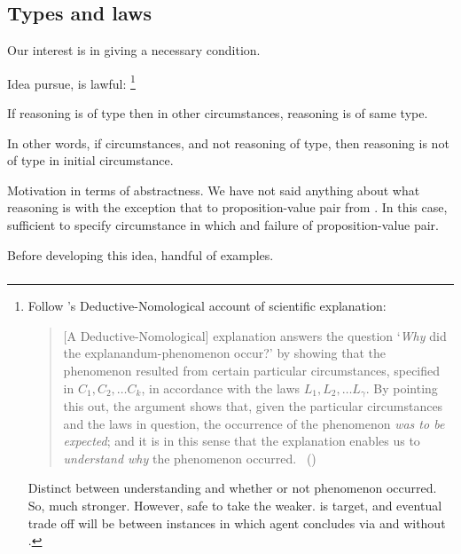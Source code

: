 \subsection{Types and laws}

\begin{note}
  Our interest is in giving a necessary condition.

  Idea pursue, \tRN{} is lawful:%
  \footnote{
    Follow \citeauthor{Hempel:1965aa}'s Deductive-Nomological account of scientific explanation:

    \begin{quote}
      [A Deductive-Nomological] explanation answers the question
      `\emph{Why} did the explanandum-phenomenon occur?'
      by showing that the phenomenon resulted from certain particular circumstances, specified in \(C_{1}, C_{2}, \dots C_{k}\), in accordance with the laws \(L_{1}, L_{2}, \dots L_{\gamma}\).
      By pointing this out, the argument shows that, given the particular circumstances and the laws in question, the occurrence of the phenomenon \emph{was to be expected}; and it is in this sense that the explanation enables us to \emph{understand why} the phenomenon occurred.%
      \mbox{ }\hfill\mbox{(\citeyear[337]{Hempel:1965aa})}
    \end{quote}

    Distinct between understanding and whether or not phenomenon occurred.
    So, much stronger.
    However, safe to take the weaker.
    \qWhyV{} is target, and eventual trade off will be between instances in which agent concludes via \tR{} and \ros{} without \wit{}.
  }

  \begin{idea}[\tRN{2}]
    \label{idea:tR-law}
    If reasoning is of type then in other circumstances, reasoning is of same type.
  \end{idea}

  In other words, if circumstances, and not reasoning of type, then reasoning is not of type in initial circumstance.

  Motivation in terms of abstractness.
  We have not said anything about what reasoning is with the exception that to proposition-value pair from \poP{}.
  In this case, sufficient to specify circumstance in which \poP{} and failure of proposition-value pair.

  Before developing this idea, handful of examples.
\end{note}

\subsubsection{}
\label{sec:illu3-1}

